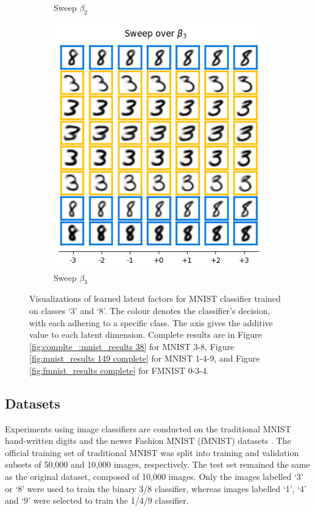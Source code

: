 \begin{figure}[t]
\begin{subfigure}[t]{.23\linewidth}
		\caption{Sweep $\beta_2$}
	\end{subfigure}
	\begin{subfigure}[t]{.23\linewidth}
		\includegraphics[width=.9\textwidth]{../openreview/pictures/Figure3/beta_3.png}
		\caption{Sweep $\beta_3$}
	\end{subfigure}
	\caption{Visualizations of learned latent factors for MNIST classifier trained on classes `3' and `8'. The colour denotes the classifier's decision, with each adhering to a specific class. The axis  gives the additive value to each latent dimension. Complete results are in Figure \ref{fig:complte_:mnist_results 38} for MNIST 3-8, Figure \ref{fig:mnist_results 149 complete} for MNIST 1-4-9, and Figure \ref{fig:fmnist_results complete} for FMNIST 0-3-4.}
	\label{fig:mnist_results 38}
\end{figure}

\subsection{Datasets}
Experiments using image classifiers are conducted  on the traditional MNIST hand-written digits \cite{lecun1998mnist} and the newer Fashion MNIST (fMNIST) datasets \cite{xiao2017fashion}. The official training set of traditional MNIST was split into training and validation subsets of 50,000  and 10,000 images, respectively. The test set remained the same as the original dataset, composed of 10,000 images. Only the images labelled `3' or `8' were used to train the binary 3/8 classifier, whereas images labelled `1', `4' and `9' were selected to train the 1/4/9 classifier. 

